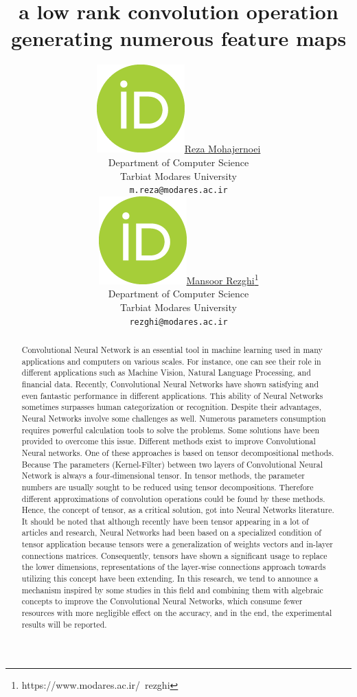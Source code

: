 \documentclass{report}
\title{a low rank convolution operation generating numerous feature maps}
\author{ \href{https://orcid.org/0000-0000-0000-0000}{\includegraphics[scale=0.06]{orcid.png}\hspace{1mm}Reza Mohajernoei}\\
	Department of Computer Science\\
	Tarbiat Modares University\\
	\texttt{m.reza@modares.ac.ir} \\
	\And
	\href{https://orcid.org/0000-0000-0000-0000}{\includegraphics[scale=0.06]{orcid.png}\hspace{1mm}Mansoor Rezghi}\thanks{https://www.modares.ac.ir/~rezghi}  \\
	Department of Computer Science\\
	Tarbiat Modares University\\
	\texttt{rezghi@modares.ac.ir} \\
}
\begin{document}
\maketitle

\begin{abstract}
	

	Convolutional Neural Network is an essential tool in machine learning used in many applications and computers on various scales. For instance, one can see their role in different applications such as Machine Vision, Natural Language Processing, and financial data. Recently, Convolutional Neural Networks have shown satisfying and even fantastic performance in different applications. This ability of Neural Networks sometimes surpasses human categorization or recognition. Despite their advantages, Neural Networks involve some challenges as well. Numerous parameters consumption requires powerful calculation tools to solve the problems. Some solutions have been provided to overcome this issue. Different methods exist to improve Convolutional Neural networks. One of these approaches is based on tensor decompositional methods. Because The parameters (Kernel-Filter) between two layers of Convolutional Neural Network is always a four-dimensional tensor. In tensor methods, the parameter numbers are usually sought to be reduced using tensor decompositions. Therefore different approximations of convolution operations could be found by these methods. Hence, the concept of tensor, as a critical solution, got into Neural Networks literature.
	It should be noted that although recently have been tensor appearing in a lot of articles and research, Neural Networks had been based on a specialized condition of tensor application because tensors were a generalization of weights vectors and in-layer connections matrices. Consequently, tensors have shown a significant usage to replace the lower dimensions, representations of the layer-wise connections approach towards utilizing this concept have been extending. In this research, we tend to announce a mechanism inspired by some studies in this field and combining them with algebraic concepts to improve the Convolutional Neural Networks, which consume fewer resources with more negligible effect on the accuracy, and in the end, the experimental results will be reported.
	

\end{abstract}


\end{document}
